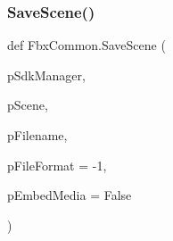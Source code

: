 \mbox{\label{namespace_fbx_common_aad3cf8f7b9a130d5d5bb59bf0ae79ce0}} 
\subsubsection{\texorpdfstring{Save\+Scene()}{SaveScene()}}
{\footnotesize\ttfamily def Fbx\+Common.\+Save\+Scene (\begin{DoxyParamCaption}\item[{}]{p\+Sdk\+Manager,  }\item[{}]{p\+Scene,  }\item[{}]{p\+Filename,  }\item[{}]{p\+File\+Format = {\ttfamily -\/1},  }\item[{}]{p\+Embed\+Media = {\ttfamily False} }\end{DoxyParamCaption})}

